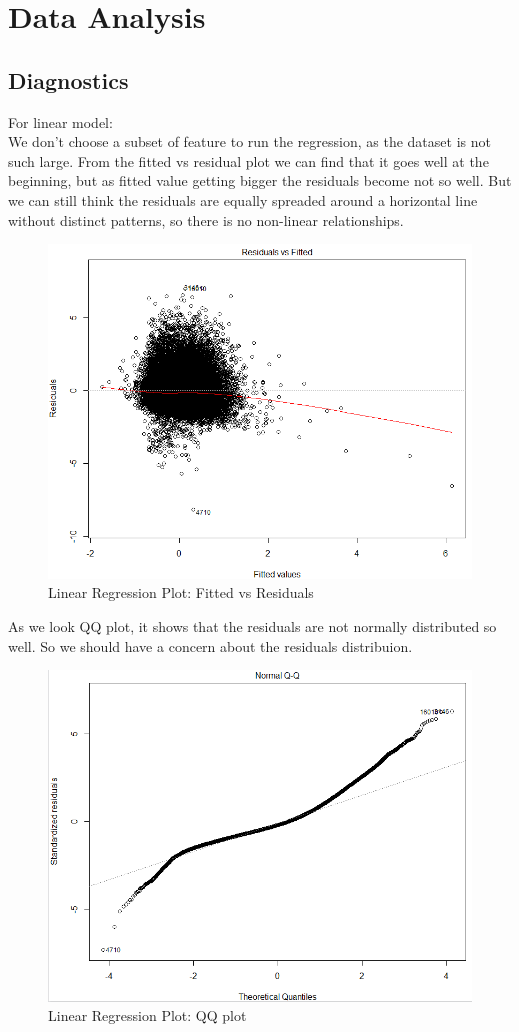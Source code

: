 \documentclass[11pt]{article}
\begin{document}
\section{Data Analysis}
\subsection{Diagnostics}
For linear model: \\
    We don't choose a subset of feature to run the regression, as the dataset is not such large. From the fitted vs residual plot we can find that it goes well at the beginning, but as fitted value getting bigger the residuals become not so well. But we can still think the residuals are equally spreaded around a horizontal line without distinct patterns, so there is no non-linear relationships.   \\
    
    \begin{figure}[h]
        \centering
        \includegraphics[width=0.7\linewidth]{linear_fvsr.png}
        \caption{Linear Regression Plot: Fitted vs Residuals}
    \end{figure}  
    
    As we look QQ plot, it shows that the residuals are not normally distributed so well. So we should have a concern about the residuals distribuion.\\
    
    \begin{figure}[h]
        \centering
        \includegraphics[width=0.6\linewidth]{linear_qq.png}
        \caption{Linear Regression Plot: QQ plot}
    \end{figure}    
    
\end{document}

